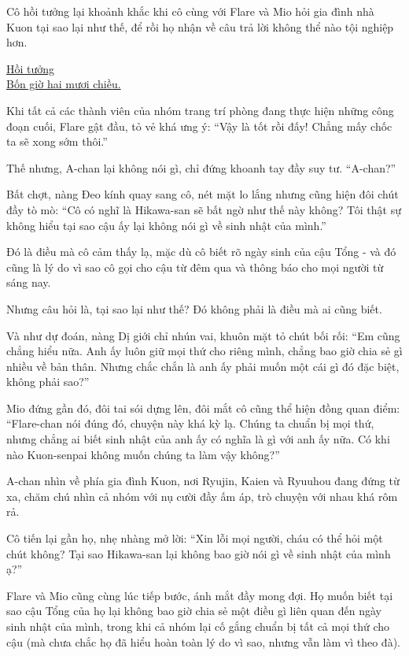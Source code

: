 \documentclass[../main.tex]{subfiles}
\begin{document}
Cô hồi tưởng lại khoảnh khắc khi cô cùng với Flare và Mio hỏi gia đình nhà Kuon tại sao lại như thế, để rồi họ nhận về câu trả lời không thể nào tội nghiệp hơn.

\begin{center}
    \uline{Hồi tưởng\\Bốn giờ hai mươi chiều.}
\end{center}

Khi tất cả các thành viên của nhóm trang trí phòng đang thực hiện những công đoạn cuối, Flare gật đầu, tỏ vẻ khá ưng ý: ``Vậy là tốt rồi đấy! Chẳng mấy chốc ta sẽ xong sớm thôi.''

Thế nhưng, A-chan lại không nói gì, chỉ đứng khoanh tay đầy suy tư. ``A-chan?''

Bất chợt, nàng Đeo kính quay sang cô, nét mặt lo lắng nhưng cũng hiện đôi chút đầy tò mò: ``Cô có nghĩ là Hikawa-san sẽ bất ngờ như thế này không? Tôi thật sự không hiểu tại sao cậu ấy lại không nói gì về sinh nhật của mình.''

Đó là điều mà cô cảm thấy lạ, mặc dù cô biết rõ ngày sinh của cậu Tổng - và đó cũng là lý do vì sao cô gọi cho cậu từ đêm qua và thông báo cho mọi người từ sáng nay.

Nhưng câu hỏi là, tại sao lại như thế? Đó không phải là điều mà ai cũng biết.

Và như dự đoán, nàng Dị giới chỉ nhún vai, khuôn mặt tỏ chút bối rối: ``Em cũng chẳng hiểu nữa. Anh ấy luôn giữ mọi thứ cho riêng mình, chẳng bao giờ chia sẻ gì nhiều về bản thân. Nhưng chắc chắn là anh ấy phải muốn một cái gì đó đặc biệt, không phải sao?''

Mio đứng gần đó, đôi tai sói dựng lên, đôi mắt cô cũng thể hiện đồng quan điểm: ``Flare-chan nói đúng đó, chuyện này khá kỳ lạ. Chúng ta chuẩn bị mọi thứ, nhưng chẳng ai biết sinh nhật của anh ấy có nghĩa là gì với anh ấy nữa. Có khi nào Kuon-senpai không muốn chúng ta làm vậy không?''

A-chan nhìn về phía gia đình Kuon, nơi Ryujin, Kaien và Ryuuhou đang đứng từ xa, chăm chú nhìn cả nhóm với nụ cười đầy ấm áp, trò chuyện với nhau khá rôm rả.

Cô tiến lại gần họ, nhẹ nhàng mở lời: ``Xin lỗi mọi người, cháu có thể hỏi một chút không? Tại sao Hikawa-san lại không bao giờ nói gì về sinh nhật của mình ạ?''

Flare và Mio cũng cùng lúc tiếp bước, ánh mắt đầy mong đợi. Họ muốn biết tại sao cậu Tổng của họ lại không bao giờ chia sẻ một điều gì liên quan đến ngày sinh nhật của mình, trong khi cả nhóm lại cố gắng chuẩn bị tất cả mọi thứ cho cậu (mà chưa chắc họ đã hiểu hoàn toàn lý do vì sao, nhưng vẫn làm vì theo đà).
\end{document}
